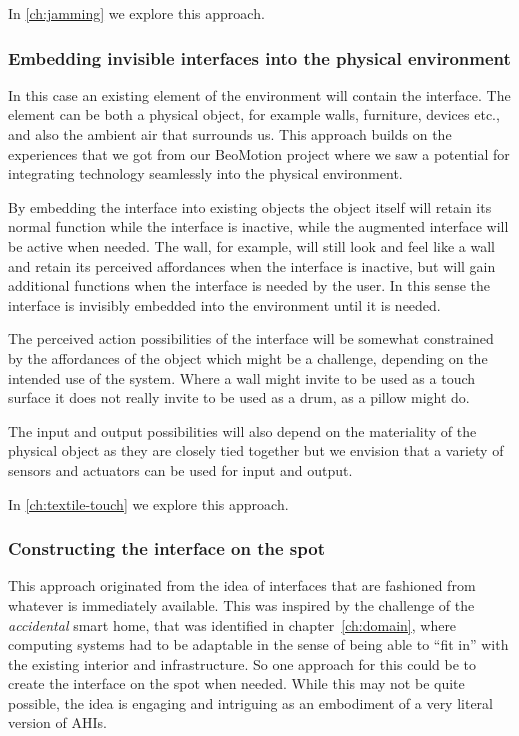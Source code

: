 In \autoref{ch:jamming} we explore this approach.

\subsubsection{Embedding invisible interfaces into the physical environment}
In this case an existing element of the environment will contain the interface.
The element can be both a physical object, for example walls, furniture, devices etc., and also the ambient air that surrounds us.
This approach builds on the experiences that we got from our BeoMotion project where we saw a potential for integrating technology seamlessly into the physical environment.

By embedding the interface into existing objects the object itself will retain its normal function while the interface is inactive, while the augmented interface will be active when needed. 
The wall, for example, will still look and feel like a wall and retain its perceived affordances when the interface is inactive, but will gain additional functions when the interface is needed by the user.
In this sense the interface is invisibly embedded into the environment until it is needed.

The perceived action possibilities of the interface will be somewhat constrained by the affordances of the object which might be a challenge, depending on the intended use of the system.
Where a wall might invite to be used as a touch surface it does not really invite to be used as a drum, as a pillow might do.

The input and output possibilities will also depend on the materiality of the physical object as they are closely tied together but we envision that a variety of sensors and actuators can be used for input and output.

In \autoref{ch:textile-touch} we explore this approach.

\subsubsection{Constructing the interface on the spot}
This approach originated from the idea of interfaces that are fashioned from whatever is immediately available.
This was inspired by the challenge of the \emph{accidental} smart home, that was identified in chapter~\ref{ch:domain}, where computing systems had to be adaptable in the sense of being able to ``fit in'' with the existing interior and infrastructure.
So one approach for this could be to create the interface on the spot when needed. 
While this may not be quite possible, the idea is engaging and intriguing as an embodiment of a very literal version of AHIs.


